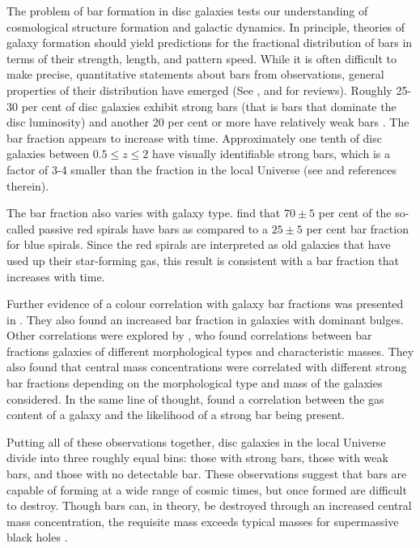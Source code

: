 The problem of bar formation in disc galaxies tests our understanding
of cosmological structure formation and galactic dynamics.  In
principle, theories of galaxy formation should yield predictions for
the fractional distribution of bars in terms of their strength,
length, and pattern speed.  While it is often difficult to make
precise, quantitative statements about bars from observations, general
properties of their distribution have emerged (See
\citet{sellwood1993}, \citet{Sellwood2013} and \citet{BT} for
reviews).  Roughly 25-30 per cent of disc galaxies exhibit strong
bars {(that is bars that dominate the disc luminosity) and another 20 per
cent or more have relatively weak bars \citep{bar_fraction_2,bar_fraction_1, masters2010, Sellwood2013}. } The bar fraction appears to
increase with time.  Approximately one tenth of disc galaxies between
$0.5 \le z \le 2$ have visually identifiable strong bars, which is a
factor of 3-4 smaller than the fraction in the local Universe (see
\citet{simmons2014} and references therein). 

The bar fraction also
varies with galaxy type.  \citet{masters2010} find that $70\pm 5$ per
cent of the so-called passive red spirals have bars as compared to a
$25\pm 5$ per cent bar fraction for blue spirals.  Since the red
spirals are interpreted as old galaxies that have used up their
star-forming gas, this result is consistent with a bar fraction that
increases with time. 

{Further evidence of a colour correlation with galaxy bar fractions was presented in \citet{masters2011}. They also found an increased bar
fraction in galaxies with dominant bulges. Other correlations were explored by \citet{na2010}, who found correlations between bar fractions galaxies of different morphological types and characteristic masses. They also found that central mass concentrations were correlated with different strong bar fractions depending on the morphological type and mass of the galaxies considered. In the same line of thought, \citet{masters2012} found a correlation between the gas content of a galaxy and the likelihood of a strong bar being present.}

{Putting all of these observations together}, 
disc galaxies in the local Universe divide into three
roughly equal bins: those with strong bars, those with weak bars, and
those with no detectable bar.  {These observations suggest that
bars are capable of forming at a wide range of cosmic times, but 
once formed are difficult to destroy. Though bars can, in theory, be
destroyed through an increased central mass concentration, the requisite
mass exceeds typical masses for supermassive black holes \citep{athanassoula_2005}.
}

